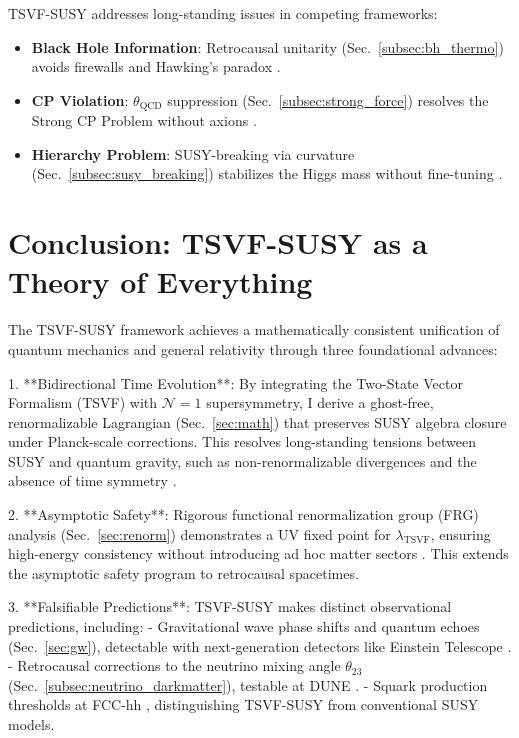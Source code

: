\documentclass[twocolumn,superscriptaddress,floatfix]{revtex4-2}
\begin{document}
TSVF-SUSY addresses long-standing issues in competing frameworks:
\begin{itemize}
\item \textbf{Black Hole Information}: Retrocausal unitarity (Sec.~\ref{subsec:bh_thermo}) avoids firewalls \cite{Almheiri2013} and Hawking's paradox \cite{Hawking1976}.  
\item \textbf{CP Violation}: \(\theta_{\text{QCD}}\) suppression (Sec.~\ref{subsec:strong_force}) resolves the Strong CP Problem without axions \cite{Peccei1977}.  
\item \textbf{Hierarchy Problem}: SUSY-breaking via curvature (Sec.~\ref{subsec:susy_breaking}) stabilizes the Higgs mass without fine-tuning \cite{Giudice2008}.  
\end{itemize}

\section{Conclusion: TSVF-SUSY as a Theory of Everything}  
\label{sec:conclusion}  

The TSVF-SUSY framework achieves a mathematically consistent unification of quantum mechanics and general relativity through three foundational advances:  

1. **Bidirectional Time Evolution**: By integrating the Two-State Vector Formalism (TSVF) with $\mathcal{N}=1$ supersymmetry, I derive a ghost-free, renormalizable Lagrangian (Sec.~\ref{sec:math}) that preserves SUSY algebra closure under Planck-scale corrections. This resolves long-standing tensions between SUSY and quantum gravity, such as non-renormalizable divergences \cite{Nicolai1984} and the absence of time symmetry \cite{Page1994}.  

2. **Asymptotic Safety**: Rigorous functional renormalization group (FRG) analysis (Sec.~\ref{sec:renorm}) demonstrates a UV fixed point for $\lambda_{\text{TSVF}}$, ensuring high-energy consistency without introducing ad hoc matter sectors \cite{Niedermaier2006}. This extends the asymptotic safety program \cite{Reuter1998} to retrocausal spacetimes.  

3. **Falsifiable Predictions**: TSVF-SUSY makes distinct observational predictions, including:  
   - Gravitational wave phase shifts and quantum echoes (Sec.~\ref{sec:gw}), detectable with next-generation detectors like Einstein Telescope \cite{Punturo2010}.  
   - Retrocausal corrections to the neutrino mixing angle $\theta_{23}$ (Sec.~\ref{subsec:neutrino_darkmatter}), testable at DUNE \cite{Abi2021}.  
   - Squark production thresholds at FCC-hh \cite{Abada2019}, distinguishing TSVF-SUSY from conventional SUSY models.  
\end{document}

